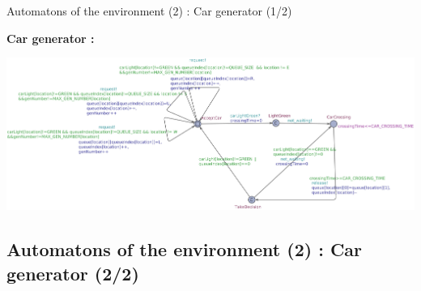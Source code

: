 \documentclass{bredelebeamer}
\begin{document}
\begin{frame}{Automatons of the environment (2) : Car generator (1/2)}


\textbf{Car generator : }

\newline

\newline


\includegraphics[scale=0.20]{images/imageCarGenerator.jpg}



\end{frame}


\subsection{Automatons of the environment (2) : Car generator (2/2)}
\end{document}
